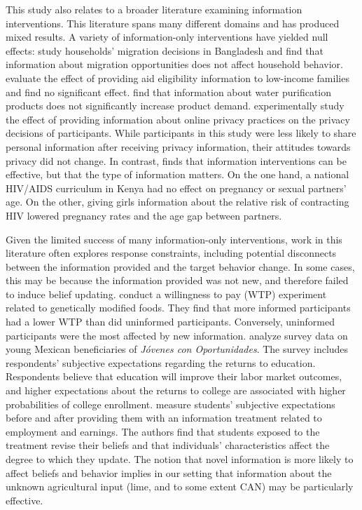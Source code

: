 \documentclass[12pt,letterpaper]{article}
\begin{document}
This study also relates to a broader literature examining information interventions. This literature spans many different domains and has produced mixed results. A variety of information-only interventions have yielded null effects: \citet{bryan_underinvestment_2014} study households' migration decisions in Bangladesh and find that information about migration opportunities does not affect household behavior. \citet{bettinger_role_2012} evaluate the effect of providing aid eligibility information to low-income families and find no significant effect.
\citet{ashraf_information_2013} find that information about water purification products does not significantly increase product demand. \citet{marreiros_now_2017} experimentally study the effect of providing information about online privacy practices on the privacy decisions of participants. While participants in this study were less likely to share personal information after receiving privacy information, their attitudes towards privacy did not change. In contrast, \citet{dupas_teenagers_2011} finds that information interventions can be effective, but that the type of information matters. On the one hand, a national HIV/AIDS curriculum in Kenya had no effect on pregnancy or sexual partners' age. On the other, giving girls information about the relative risk of contracting HIV lowered pregnancy rates and the age gap between partners. 

Given the limited success of many information-only interventions, work in this literature often explores response constraints, including  potential disconnects between the information provided and the target behavior change. In some cases, this may be because the information provided was not new, and therefore failed to induce belief updating. \citet{huffman_effects_2007} conduct a willingness to pay (WTP) experiment related to genetically modified foods. They find that more informed participants had a lower WTP than did uninformed participants. Conversely, uninformed participants were the most affected by new information. \citet{attanasio_education_2017} analyze survey data on young Mexican beneficiaries of \textit{J\'ovenes con Oportunidades}. The survey includes respondents' subjective expectations regarding the returns to education. Respondents believe that education will improve their labor market outcomes, and higher expectations about the returns to college are associated with higher probabilities of college enrollment. \citet{wiswall_how_2015} measure students' subjective expectations before and after providing them with an information treatment related to employment and earnings. The authors find that students exposed to the treatment revise their beliefs and that individuals' characteristics affect the degree to which they update. The notion that novel information is more likely to affect beliefs and behavior implies in our setting that information about the unknown agricultural input (lime, and to some extent CAN) may be particularly effective.
\end{document}
